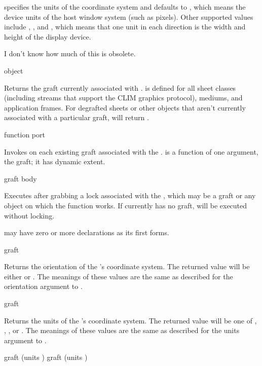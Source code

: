 specifies the units of the coordinate system and defaults to
, which means the device units of the host window system (such as
pixels).  Other supported values include , , and
, which means that one unit in each direction is the width and
height of the display device.

 {I don't know how much of this is obsolete.}

 {object}

Returns the graft currently associated with .   is
defined for all sheet classes (including streams that support the CLIM
graphics protocol), mediums, and application frames.  For degrafted sheets or
other objects that aren't currently associated with a particular graft,
 will return .

 {function port}

Invokes  on each existing graft associated with the 
.   is a function of one argument, the graft; it has
dynamic extent.

 {graft \body body}

Executes  after grabbing a lock associated with the 
, which may be a graft or any object on which the function
 works.  If  currently has no graft,  will
be executed without locking.

 may have zero or more declarations as its first forms.


 {graft}

Returns the orientation of the  's coordinate system.
The returned value will be either  or .  The meanings
of these values are the same as described for the orientation argument to
.

 {graft}

Returns the units of the  's coordinate system.  The
returned value will be one of , , , or
.  The meanings of these values are the same as described for
the units argument to .

 {graft \key (units )}
 {graft \key (units )}


